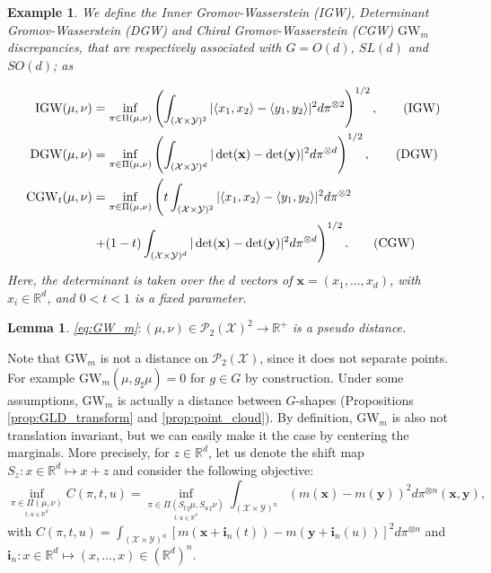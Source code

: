 \documentclass{article}
\newcommand{\R}{\mathbb{R}}
\newcommand{\Y}{\mathcal{Y}}
\newcommand{\X}{\mathcal{X}}
\newcommand{\1}{\mathbf{1}}
\newcommand{\DGW}{\mathrm{DGW}}
\newcommand{\CGW}{\mathrm{CGW}}
\newcommand{\IGW}{\mathrm{IGW}}
\newcommand{\GW}{\mathrm{GW}}
\renewcommand{\P}{\mathcal{P}}
\newtheorem{lemma}{Lemma}
\newtheorem{example}{Example}
\theoremstyle{definition}
\theoremstyle{remark}
\begin{document}
\begin{example}\label{example:costs_def}
    We define  the Inner Gromov-Wasserstein \emph{(IGW)}, Determinant Gromov-Wasserstein \emph{(DGW)} and Chiral Gromov-Wasserstein \emph{(CGW)} $\GW_m$ discrepancies, that are respectively associated with $G= O(d)$, $SL(d)$ and $SO(d)$; as

    \begin{align}
\IGW(\mu,\nu) &= \inf_{\pi\in\Pi(\mu,\nu)}\left(\int_{(\X\times\Y)^2}|\langle x_1,x_2\rangle-\langle y_1,y_2\rangle|^2d\pi^{\otimes 2}\right)^{1/2}, \label{eq:IGW} \tag{$\IGW$}\\
\DGW(\mu,\nu)&=\inf_{\pi\in\Pi(\mu,\nu)}\left(\int_{(\X\times\Y)^d}|\det(\mathbf{x})-\det(\mathbf{y})|^2d\pi^{\otimes d}\right)^{1/2},\label{eq:DGW} \tag{$\DGW$}\\
\CGW_t(\mu,\nu)& =  \inf_{\pi\in\Pi(\mu,\nu)}\left(t\int_{(\X\times\Y)^2}|\langle x_1,x_2\rangle-\langle y_1,y_2\rangle|^2d\pi^{\otimes 2} \right.\nonumber \\ &\left.+ (1-t)\int_{(\X\times\Y)^d}|\det(\mathbf{x})-\det(\mathbf{y})|^2d\pi^{\otimes d}\right)^{1/2}.\label{eq:CGW} \tag{$\CGW$}
\end{align}
Here, the determinant is taken over the $d$ vectors of $\mathbf{x}=(x_1,\dots,x_d)$, with $x_i\in \R^d$, and $0<t<1$ is a fixed parameter.
\end{example}
\begin{lemma}\label{lemma:distance} 
 \ref{eq:GW_m}$:(\mu,\nu)\in 
 \P_2(\X)^2\to\R^+$ is a pseudo distance. 
\end{lemma}
Note that $\GW_m$ is not a distance on $\P_2(\X)$, since it does not separate points. For example $\GW_m(\mu,g_\sharp\mu)=0$ for $g\in G$ by construction. Under some assumptions, $\GW_m$ is actually a distance between $G$-shapes (Propositions \ref{prop:GLD_transform} and \ref{prop:point_cloud}). 
By definition, $\GW_m$ is also not translation invariant, but we can easily make it the case by centering the marginals. More precisely,  for $z\in\R^d$, let us denote the shift map  $S_z:x\in\R^d\mapsto x+z$ and consider the following objective: 
\begin{equation}\label{eq:translation}
        \inf_{\underset{t,u\in\R^d}{\pi\in\Pi(\mu,\nu)}} C(\pi,t,u) = \inf_{\underset{t,u\in\R^d}{\pi\in\Pi(S_{t\,\sharp}\mu ,S_{u\,\sharp}\nu)}}\int_{(\X\times\Y)^n}(m(\mathbf{x})-m(\mathbf{y}))^2d\pi^{\otimes n}(\mathbf{x},\mathbf{y}) ,
\end{equation}
with $C(\pi,t,u)=\int_{(\X\times\Y)^n}[m(\mathbf{x}+\mathbf{i}_n(t))-m(\mathbf{y}+\mathbf{i}_n(u))]^2d\pi^{\otimes n}$ and $\mathbf{i}_n:x\in\R^d\mapsto (x,\dots,x)\in(\R^d)^n$.
\end{document}
